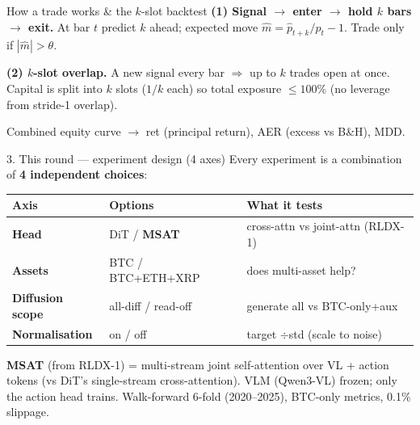 \documentclass[aspectratio=169]{beamer}
\begin{document}
\begin{frame}{How a trade works \& the $k$-slot backtest}
\small
\textbf{(1) Signal $\to$ enter $\to$ hold $k$ bars $\to$ exit.} At bar $t$ predict $k$ ahead; expected move $\hat m=\hat p_{t+k}/p_t-1$. Trade only if $|\hat m|>\theta$.
\begin{center}
\end{center}
\vspace{-0.5ex}
\textbf{(2) $k$-slot overlap.} A new signal every bar $\Rightarrow$ up to $k$ trades open at once. Capital is split into $k$ slots ($1/k$ each) so total exposure $\le100\%$ (no leverage from stride-1 overlap).
\begin{center}
\end{center}
\vspace{-0.5ex}
\footnotesize Combined equity curve $\to$ ret (principal return), AER (excess vs B\&H), MDD.
\end{frame}
\begin{frame}{3. This round --- experiment design (4 axes)}
\small
Every experiment is a combination of \textbf{4 independent choices}:
\begin{center}\begin{tabular}{lll}
\toprule
Axis & Options & What it tests \\ \midrule
\textbf{Head} & DiT / \textbf{MSAT} & cross-attn vs joint-attn (RLDX-1) \\
\textbf{Assets} & BTC / BTC+ETH+XRP & does multi-asset help? \\
\textbf{Diffusion scope} & all-diff / read-off & generate all vs BTC-only+aux \\
\textbf{Normalisation} & on / off & target $\div$std (scale to noise) \\
\bottomrule
\end{tabular}\end{center}
\vspace{.6ex}
\footnotesize \textbf{MSAT} (from RLDX-1) = multi-stream joint self-attention over VL + action tokens
(vs DiT's single-stream cross-attention). VLM (Qwen3-VL) frozen; only the action head trains.
Walk-forward 6-fold (2020--2025), BTC-only metrics, 0.1\% slippage.
\end{frame}
\end{document}
